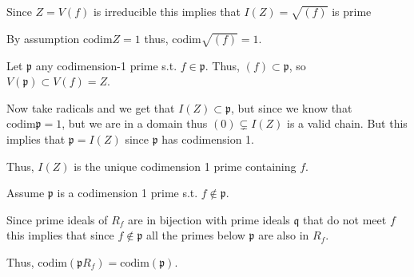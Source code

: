 \documentclass[12pt, letterpaper]{article}
\newcommand{\p}{\mathfrak{p}}
\newcommand{\mf}[1]{\mathfrak{#1}}
\newcommand{\codim}{\mathrm{codim}}
\begin{document}
\begin{problem}{}
    
\end{problem}
\begin{subproblem}{}
    
\end{subproblem}
\begin{problemproof}
    Since $Z= V(f)$ is irreducible this implies that $I(Z)=\sqrt{(f)}$ is prime

    By assumption $\codim Z = 1$ thus, $\codim \sqrt{(f)} = 1$.

    Let $\p$ any codimension-1 prime s.t. $f \in \p$. Thus, $(f) \subset \p$, so $V(\p) \subset V(f) = Z$.

    Now take radicals and we get that $I(Z) \subset \p$, but since we know that $\codim \p = 1$,  but we are in a domain thus $(0) \subsetneq I(Z)$ is a valid chain. But this implies that $\p = I(Z)$ since $\p$ has codimension 1.

    Thus, $I(Z)$ is the unique codimension 1 prime containing $f$.

    Assume $\p$ is a codimension 1 prime s.t. $f \notin \p$.

    Since prime ideals of $R_f$ are in bijection with prime ideals $\mf{q}$ that do not meet $f$ this implies that since $f \notin \p$ all the primes below $\p$ are also in $R_f$.

    Thus, $\codim(\p R_f) = \codim (\p)$.
\end{problemproof}
\end{document}
